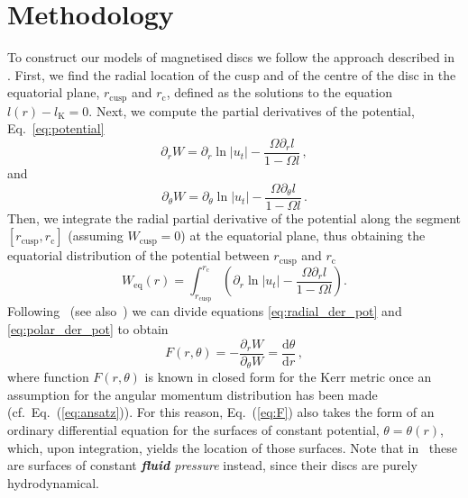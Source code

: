 \documentclass[]{aa}
\begin{document}
\section{Methodology}
\label{methodology}

To construct our models of magnetised discs we follow the approach described in \citet{Qian:2009}. First, we find the radial location of the cusp and of the centre of the disc in the equatorial plane, $r_{\mathrm{cusp}}$ and $r_{\mathrm{c}}$, defined as the solutions to the equation $l(r) - l_{\mathrm{K}} = 0$.
Next, we compute the partial derivatives of the potential, Eq.~\eqref{eq:potential}
\begin{equation}\label{eq:radial_der_pot}
\partial_r W = \partial_r \ln|u_t| - \frac{\Omega \partial_rl}{1 - \Omega l}\,,
\end{equation}
and
\begin{equation}\label{eq:polar_der_pot}
\partial_{\theta} W = \partial_{\theta} \ln|u_t| - \frac{\Omega \partial_{\theta}l}{1 - \Omega l}\,.
\end{equation}
Then, we integrate the radial partial derivative of the potential along the segment $[r_{\mathrm{cusp}}, r_{\mathrm{c}}]$ (assuming $W_{\mathrm{cusp}} = 0$) at the equatorial plane, thus obtaining the equatorial distribution of the potential between $r_{\mathrm{cusp}}$ and $r_{\mathrm{c}}$
\begin{equation}\label{eq:equatorial_pot}
W_{\mathrm{eq}}(r) = \int^{r_{\mathrm{c}}}_{r_{\mathrm{cusp}}}\left(\partial_r \ln|u_t| - \frac{\Omega \partial_rl}{1 - \Omega l}\right).
\end{equation}
Following~\citet{Qian:2009} (see also~\citet{Jaroszynski:1980}) we can divide equations \eqref{eq:radial_der_pot} and \eqref{eq:polar_der_pot} to obtain
\begin{equation}\label{eq:F}
F(r, \theta) = -\frac{\partial_r W}{\partial_{\theta} W} = \frac{\mathrm{d}\theta}{\mathrm{d}r}\,,
\end{equation}
where function $F(r, \theta)$ is known in closed form for the Kerr metric once an assumption for the angular momentum distribution has been made (cf.~Eq.~(\ref{eq:ansatz})). For this reason, Eq.~(\ref{eq:F}) also takes the form of an ordinary differential equation for the surfaces of constant potential, $\theta=\theta(r)$, which, upon integration, yields the location of those surfaces. Note that in~\citet{Qian:2009} these are surfaces of constant {\it {\bf fluid} pressure} instead, since their discs are purely hydrodynamical.
\end{document}
